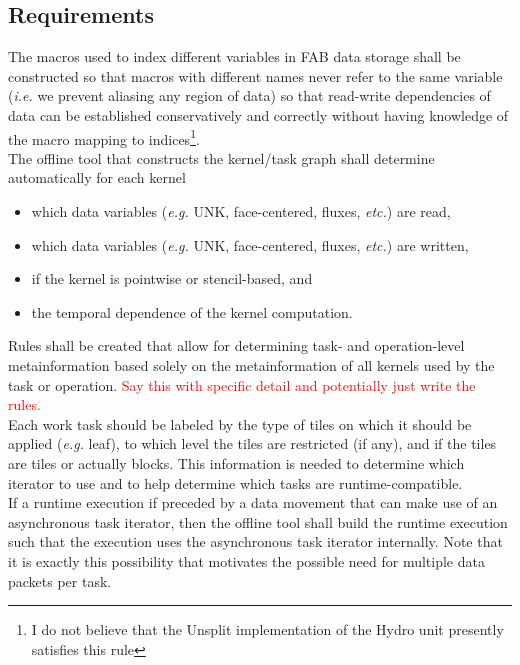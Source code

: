 \documentclass{article}
\begin{document}
\subsection{Requirements}

The macros used to index different variables in FAB data storage shall be
constructed so that macros with different names never refer to the same
variable (\textit{i.e.} we prevent aliasing any region of data) so that
read-write dependencies of data can be established conservatively and correctly
without having knowledge of the macro mapping to indices\footnote{I do not
believe that the Unsplit implementation of the Hydro unit presently satisfies
this rule}.\\

The offline tool that constructs the kernel/task graph shall determine
automatically for each kernel
\begin{itemize}
\item{which data variables (\textit{e.g.} UNK, face-centered, fluxes,
\textit{etc.}) are read,}
\item{which data variables (\textit{e.g.} UNK, face-centered, fluxes,
\textit{etc.}) are written,}
\item{if the kernel is pointwise or stencil-based, and}
\item{the temporal dependence of the kernel computation.}
\end{itemize}

Rules shall be created that allow for determining task- and operation-level
metainformation based solely on the metainformation of all kernels used by the
task or operation.  \textcolor{red}{Say this with specific detail and
potentially just write the rules.}\\

Each work task should be labeled by the type of tiles on which it should be
applied (\textit{e.g.} leaf), to which level the tiles are restricted (if any),
and if the tiles are tiles or actually blocks.  This information is needed to
determine which iterator to use and to help determine which tasks are
runtime-compatible.\\

If a runtime execution if preceded by a data movement that can make use of an
asynchronous task iterator, then the offline tool shall build the runtime
execution such that the execution uses the asynchronous task iterator
internally.  Note that it is exactly this possibility that motivates the
possible need for multiple data packets per task.
\end{document}
